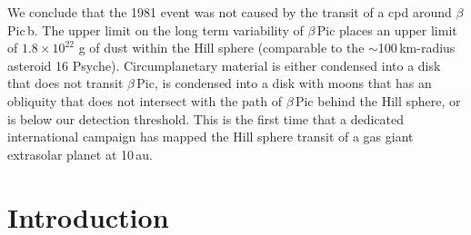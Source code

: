 \documentclass[longauth]{aa} %
\newcommand{\bpb}{$\beta$\,Pic\,b}
\newcommand{\bp}{$\beta$\,Pic}
\begin{document}
   {We conclude that the 1981 event was not caused by the transit of a \ac{cpd} around \bpb{}.
   The upper limit on the long term variability of \bp{} places an upper limit of $1.8\times 10^{22}$ g of dust within the Hill sphere (comparable to the $\sim$100\,km-radius asteroid 16 Psyche). 
   Circumplanetary material is either condensed into a disk that does not transit \bp{}, is condensed into a disk with moons that has an obliquity that does not intersect with the path of \bp{} behind the Hill sphere, or is below our detection threshold.
   This is the first time that a dedicated international campaign has mapped the Hill sphere transit of a gas giant extrasolar planet at 10\,au.}
   

   \maketitle
%

\section{Introduction}
\end{document}

